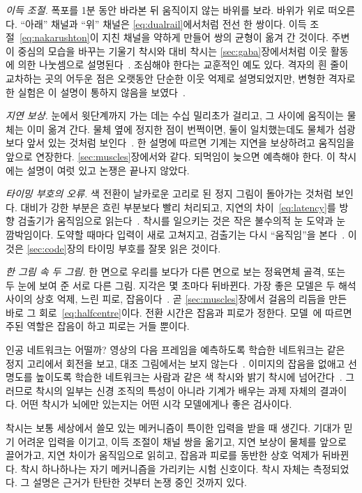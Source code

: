 \emph{이득 조절.} 폭포를 1분 동안 바라본 뒤 움직이지 않는 바위를 보라. 바위가 위로 떠오른다. “아래” 채널과 “위” 채널은 \eqref{eq:dualrail}에서처럼 전선 한 쌍이다. 이득 조절~\eqref{eq:nakarushton}이 지친 채널을 약하게 만들어 쌍의 균형이 옮겨 간 것이다. 주변이 중심의 모습을 바꾸는 기울기 착시와 대비 착시는 \ref{sec:gaba}장에서처럼 이웃 활동에 의한 나눗셈으로 설명된다~\cite{Schwartz2009}. 조심해야 한다는 교훈적인 예도 있다. 격자의 흰 줄이 교차하는 곳의 어두운 점은 오랫동안 단순한 이웃 억제로 설명되었지만, 변형한 격자로 한 실험은 이 설명이 통하지 않음을 보였다~\cite{SchillerCarvey2005}.

\emph{지연 보상.} 눈에서 윗단계까지 가는 데는 수십 밀리초가 걸리고, 그 사이에 움직이는 물체는 이미 옮겨 간다. 물체 옆에 정지한 점이 번쩍이면, 둘이 일치했는데도 물체가 섬광보다 앞서 있는 것처럼 보인다~\cite{Nijhawan1994}. 한 설명에 따르면 기계는 지연을 보상하려고 움직임을 앞으로 연장한다. \ref{sec:muscles}장에서와 같다. 되먹임이 늦으면 예측해야 한다. 이 착시에는 설명이 여럿 있고 논쟁은 끝나지 않았다.

\emph{타이밍 부호의 오류.} 색 전환이 날카로운 고리로 된 정지 그림이 돌아가는 것처럼 보인다. 대비가 강한 부분은 흐린 부분보다 빨리 처리되고, 지연의 차이~\eqref{eq:latency}를 방향 검출기가 움직임으로 읽는다~\cite{Conway2005}. 착시를 일으키는 것은 작은 불수의적 눈 도약과 눈 깜박임이다. 도약할 때마다 입력이 새로 고쳐지고, 검출기는 다시 “움직임”을 본다~\cite{OteroMillan2012}. 이것은 \ref{sec:code}장의 타이밍 부호를 잘못 읽은 것이다.

\emph{한 그림 속 두 그림.} 한 면으로 우리를 보다가 다른 면으로 보는 정육면체 골격, 또는 두 눈에 보여 준 서로 다른 그림. 지각은 몇 초마다 뒤바뀐다. 가장 좋은 모델은 두 해석 사이의 상호 억제, 느린 피로, 잡음이다~\cite{MorenoBote2007}. 곧 \ref{sec:muscles}장에서 걸음의 리듬을 만든 바로 그 회로~\eqref{eq:halfcentre}이다. 전환 시간은 잡음과 피로가 정한다. 모델~\cite{MorenoBote2007}에 따르면 주된 역할은 잡음이 하고 피로는 거들 뿐이다.

인공 네트워크는 어떨까? 영상의 다음 프레임을 예측하도록 학습한 네트워크는 같은 정지 고리에서 회전을 보고, 대조 그림에서는 보지 않는다~\cite{Watanabe2018}. 이미지의 잡음을 없애고 선명도를 높이도록 학습한 네트워크는 사람과 같은 색 착시와 밝기 착시에 넘어간다~\cite{GomezVilla2020}. 그러므로 착시의 일부는 신경 조직의 특성이 아니라 기계가 배우는 과제 자체의 결과이다. 어떤 착시가 뇌에만 있는지는 어떤 시각 모델에게나 좋은 검사이다.

\begin{keyblock}
\begin{proposition}
\label{prop:illusions}
착시는 보통 세상에서 쓸모 있는 메커니즘이 특이한 입력을 받을 때 생긴다. 기대가 믿기 어려운 입력을 이기고, 이득 조절이 채널 쌍을 옮기고, 지연 보상이 물체를 앞으로 끌어가고, 지연 차이가 움직임으로 읽히고, 잡음과 피로를 동반한 상호 억제가 뒤바뀐다. 착시 하나하나는 자기 메커니즘을 가리키는 시험 신호이다. 착시 자체는 측정되었다. 그 설명은 근거가 탄탄한 것부터 논쟁 중인 것까지 있다.
\end{proposition}
\end{keyblock}

